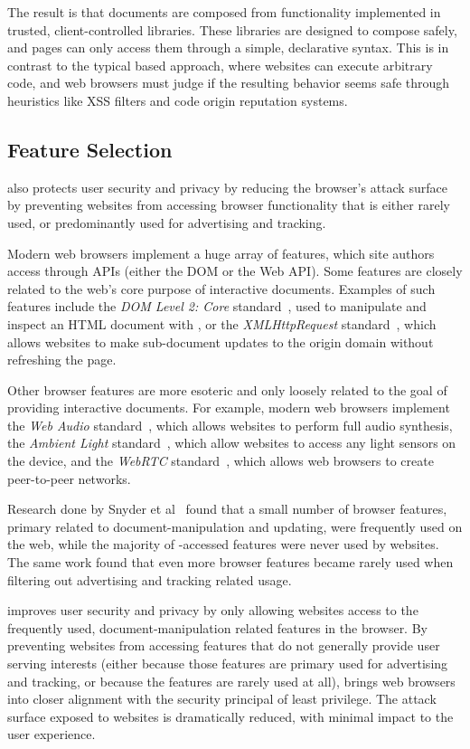 The result is that \CDF documents
are composed from functionality implemented in trusted, client-controlled libraries.
These libraries are designed to compose safely, and pages can only access them through
a simple, declarative syntax.  This is in contrast to the typical \JS based approach, where websites
can execute arbitrary code, and web browsers must judge if the resulting
behavior seems safe through heuristics like XSS filters and code origin
reputation systems.


\subsection{\CDF Feature Selection}
\label{future-web:design:feature-selection}
\CDF also protects user security and privacy by reducing the browser's attack
surface by preventing websites from accessing browser functionality that
is either rarely used, or predominantly used for advertising and tracking.

Modern web browsers implement a huge array of features, which site authors
access through \JS APIs (either the DOM or the Web API).  Some features
are closely related to the web's core purpose of interactive
documents.  Examples of such features include the \textit{DOM Level 2: Core}
standard~\cite{dom2corew3c}, used to manipulate and inspect an HTML document
with \JS, or the \textit{XMLHttpRequest} standard~\cite{ajaxwhatwg}, which allows
websites to make sub-document updates to the origin domain without refreshing
the page.

Other browser features are more esoteric and only loosely related to the goal
of providing interactive documents.  For example, modern web browsers
implement the \textit{Web Audio} standard~\cite{webaudio2018standard}, which
allows websites to perform full audio synthesis, the \emph{Ambient Light}
standard~\cite{ambientlightapi}, which allow websites to access any light
sensors on the device, and the \emph{WebRTC} standard~\cite{webrtcw3c}, which
allows web browsers to create peer-to-peer networks.

Research done by Snyder et al~\cite{snyder2016browser} found that a small
number of browser features, primary related to document-manipulation and updating,
were frequently used on the web, while the majority of \JS-accessed
features were never used by websites.  The same work found that even more
browser features became rarely used when filtering out advertising and tracking
related usage.

\CDF improves user security and privacy by only allowing websites access
to the frequently used, document-manipulation related features in the browser.
By preventing websites from accessing features that do not generally provide
user serving interests (either because those features are primary used for
advertising and tracking, or because the features are rarely used at all),
\CDF brings web browsers into closer alignment with the security principal of
least privilege.  The attack surface exposed to websites is
dramatically reduced, with minimal impact to the user experience.


